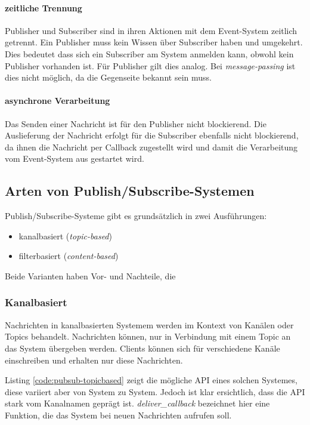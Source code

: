 \paragraph{zeitliche Trennung}
Publisher und Subscriber sind in ihren Aktionen mit dem Event-System zeitlich getrennt. Ein Publisher muss kein Wissen über Subscriber haben und umgekehrt. Dies bedeutet dass sich ein Subscriber am System anmelden kann, obwohl kein Publisher vorhanden ist. Für Publisher gilt dies analog. Bei \emph{message-passing} ist dies nicht möglich, da die Gegenseite bekannt sein muss.

\paragraph{asynchrone Verarbeitung}
Das Senden einer Nachricht ist für den Publisher nicht blockierend. Die Auslieferung der Nachricht erfolgt für die Subscriber ebenfalls nicht blockierend, da ihnen die Nachricht per Callback zugestellt wird und damit die Verarbeitung vom Event-System aus gestartet wird.


\subsection{Arten von Publish/Subscribe-Systemen}
Publish/Subscribe-Systeme gibt es grundsätzlich in zwei Ausführungen:
\begin{itemize}
\item kanalbasiert (\emph{topic-based})
\item filterbasiert (\emph{content-based})
\end{itemize}

Beide Varianten haben Vor- und Nachteile, die 

\subsubsection{Kanalbasiert}
\label{chap:grundlagen:pubsub:kanalbasiert}
Nachrichten in kanalbasierten Systemem werden im Kontext von Kanälen oder Topics behandelt. Nachrichten können, nur in Verbindung mit einem Topic an das System übergeben werden. Clients können sich für verschiedene Kanäle einschreiben und erhalten nur diese Nachrichten.

Listing \vref{code:pubsub-topicbased} zeigt die mögliche API eines solchen Systemes, diese variiert aber von System zu System. Jedoch ist klar ersichtlich, dass die API stark vom Kanalnamen geprägt ist. \emph{deliver\_callback} bezeichnet hier eine Funktion, die das System bei neuen Nachrichten aufrufen soll.

